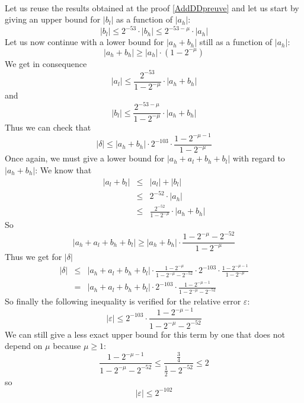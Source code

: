 \documentclass[a4paper,10pt,twoside]{article}
\newenvironment{proof}[1][Proof]{\begin{trivlist}
\item[\hskip \labelsep {\bfseries #1}]}{\end{trivlist}}
\newcommand{\qed}{\nobreak \ifvmode \relax \else \ifdim \lastskip<1.5em \hskip-\lastskip
\hskip1.5em plus0em minus0.5em \fi \nobreak \vrule height0.75em width0.5em depth0.25em\fi}
\newcommand{\hi}{\ensuremath{\mathit{h}}}
\newcommand{\lo}{\ensuremath{\mathit{l}}}
\renewcommand{\epsilon}{\varepsilon}
\begin{document}
\begin{proof} ~ \\
Let us reuse the results obtained at the proof \ref{AddDDpreuve} and let us
start by giving an upper bound for $\left \vert b_\lo \right \vert$
as a function of $\left \vert a_\hi  \right \vert$:
$$\left \vert b_\lo \right \vert \leq 2^{-53} \cdot \left \vert b_\hi \right \vert \leq 2^{-53-\mu} \cdot \left \vert a_\hi \right \vert$$
Let us now continue with a lower bound for $\left \vert a_\hi + b_\hi \right
\vert$ still as a function of $\left \vert a_\hi \right \vert$:
$$\left \vert a_\hi + b_\hi \right \vert \geq \left \vert a_\hi \right \vert \cdot \left( 1 - 2^{-\mu} \right)$$
We get in consequence
$$\left \vert a_\lo \right \vert \leq \frac{2^{-53}}{1-2^{-\mu}} \cdot \left \vert a_\hi + b_\hi \right \vert$$
and
$$\left \vert b_\lo \right \vert \leq \frac{2^{-53-\mu}}{1-2^{-\mu}} \cdot \left \vert a_\hi + b_\hi \right \vert$$
Thus we can check that
$$\left \vert \delta \right \vert \leq \left \vert a_\hi + b_\hi \right \vert \cdot 2^{-103} \cdot \frac{1-2^{-\mu-1}}{1-2^{-\mu}}$$
Once again, we must give a lower bound for $\left \vert a_\hi + a_\lo + b_\hi
  + b_\lo \right \vert$
with regard to $\left \vert a_\hi + b_\hi \right \vert$:
We know that 
\begin{eqnarray*}
\left \vert a_\lo + b_\lo \right \vert & \leq & \left \vert a_\lo \right \vert + \left \vert b_\lo \right \vert \\
& \leq & 2^{-52} \cdot \left \vert a_\hi \right \vert \\
& \leq & \frac{2^{-52}}{1-2^{-\mu}} \cdot \left \vert a_\hi + b_\hi \right \vert
\end{eqnarray*}
So
$$\left \vert a_\hi + a_\lo + b_\hi + b_\lo \right \vert \geq \left \vert a_\hi + b_\hi \right \vert \cdot \frac{1-2^{-\mu}-2^{-52}}{1-2^{-\mu}}$$
Thus we get for $\left \vert \delta \right \vert$
\begin{eqnarray*}
\left \vert \delta \right \vert & \leq & \left \vert a_\hi + a_\lo + b_\hi + b_\lo \right \vert \cdot \frac{1-2^{-\mu}}{1-2^{-\mu}-2^{-52}} \cdot 
2^{-103} \cdot \frac{1-2^{-\mu-1}}{1-2^{-\mu}} \\
& = & \left \vert a_\hi + a_\lo + b_\hi + b_\lo \right \vert \cdot 2^{-103} \cdot \frac{1-2^{-\mu-1}}{1-2^{-\mu}-2^{-52}}
\end{eqnarray*}
So finally the following inequality is verified for the relative error $\epsilon$:
$$\left \vert \epsilon \right \vert \leq 2^{-103} \cdot \frac{1-2^{-\mu-1}}{1-2^{-\mu}-2^{-52}}$$
We can still give a less exact upper bound for this term by one that does not
depend on $\mu$ because $\mu \geq 1$:
$$\frac{1-2^{-\mu-1}}{1-2^{-\mu}-2^{-52}}\leq\frac{\frac{3}{4}}{\frac{1}{2}-2^{-52}}\leq 2$$
so
$$\left \vert \epsilon \right \vert \leq 2^{-102}$$\qed
\end{proof}
\end{document}
